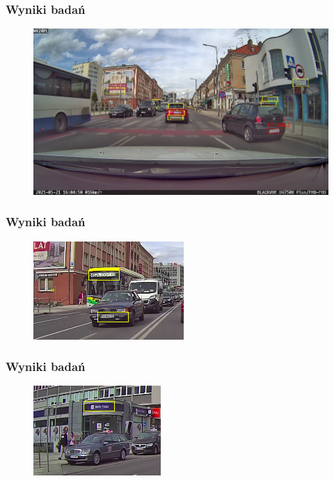 \documentclass{beamer}
\begin{document}
    \begin{frame}
        \frametitle{Wyniki badań}
        \begin{figure}
            \includegraphics[scale=0.3]{../WIZUT-Dyplom-styl/Pictures/tablica_rozpoznana}
        \end{figure}
    \end{frame}

    \begin{frame}
        \frametitle{Wyniki badań}
        \begin{figure}
            \includegraphics[scale=1]{../WIZUT-Dyplom-styl/Pictures/autobus}
        \end{figure}
    \end{frame}

    \begin{frame}
        \frametitle{Wyniki badań}
        \begin{figure}
            \includegraphics[scale=1]{../WIZUT-Dyplom-styl/Pictures/bank}
        \end{figure}
    \end{frame}
\end{document}
